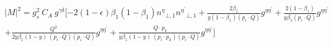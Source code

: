 \begin{equation}
\begin{split}
&{|{M}|}^2 =g_s^2\: C_A\:g^{{{\gamma}}{{\delta}}}[-2(1-\epsilon){\beta_1}(1-\beta_1){n^{{\eta}}}_{\bot,1}{n^{{\eta}^{\prime}}}_{\bot,1}+\frac{2\beta_1}{y(1-\beta_1) (p_i \cdot Q)}g^{{{\eta}}{{\eta}^{\prime}}}+\frac{2(1-\beta_1)}{y\beta_1 (p_i \cdot Q)}g^{{{\eta}}{{\eta}^{\prime}}}\\
&+\frac{Q^2}{2y\beta_1 (1-y)\:(p_i \cdot Q)(p_i \cdot Q)}g^{{{\eta}}{{\eta}^{\prime}}}+\frac{\:Q\cdot p_k}{y\beta_1 (1-y)\:(p_i \cdot p_k)(p_i \cdot Q)}g^{{{\eta}}{{\eta}^{\prime}}}]  \\
\end{split}
\end{equation}






















